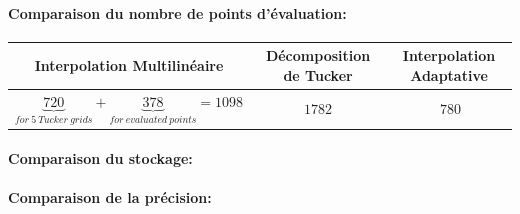 \paragraph{Comparaison du nombre de points d'évaluation:}
\begin{center}
\begin{tabular}{|*{3}{c|}}
	\hline
	Interpolation Multilinéaire    																																& Décomposition de Tucker 	& Interpolation Adaptative 	\\
	\hline
	$\underbrace{720}_{for\ 5\ Tucker\ grids} + \underbrace{378}_{for\ evaluated\ points} = 1098$	& $1782$										& $~780$ 								\\
	\hline
\end{tabular}
\end{center}


\paragraph{Comparaison du stockage:}
\paragraph{Comparaison de la précision:}



